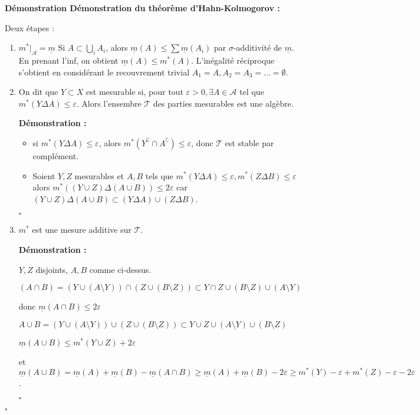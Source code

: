 \documentclass[10pt,a4paper,notitlepage ]{report}
\newcommand{\1}{\mathds 1}
\newcommand{\comp}[1]{#1^\complement}
\newcounter{th}
\newenvironment{demo}[1][]{

	\textbf{Démonstration #1 :}
}{\begin{flushright}
	$\square$
\end{flushright}
}
\begin{document}
\begin{demo}[Démonstration du théorème d'Hahn-Kolmogorov]
	Deux étapes : \begin{enumerate}
		\item $m^*|_{\mathcal A} = \underline m$
		Si $A \subset \underset i \bigcup A_i$, alors $\underline m (A) \le \sum \underline m (A_i)$ par $\sigma$-additivité de $\underline m$. En prenant l'inf, on obtient $\underline m(A) \le m^*(A)$. L'inégalité réciproque s'obtient en considérant le recouvrement trivial $A_1 = A, A_2=A_3 = \dots = \emptyset$.
		\item On dit que $Y \subset X$ est mesurable si, pour tout $\varepsilon > 0, \exists A \in \mathcal A$ tel que $m^*(Y \Delta A) \le \varepsilon$. Alors l'ensembre $\mathcal T$ des parties mesurables est une algèbre.
		\begin{demo}
			\begin{itemize}
				\item si $m^*(Y \Delta A) \le \varepsilon$, alors $m^*(\comp Y \cap \comp A) \le \varepsilon$, donc $\mathcal T$ est stable par complément.
				\item Soient $Y, Z$ mesurables et $A, B$ tels que $m^*(Y \Delta A) \le \varepsilon, m^*(Z \Delta B) \le \varepsilon$ alors $m^*((Y \cup Z) \Delta (A \cup B)) \le 2\varepsilon$ car $(Y \cup Z)  \Delta (A \cup B) \subset (Y \Delta A) \cup (Z \Delta B)$.
			\end{itemize}
		\end{demo}
		\item $m^*$ est une mesure additive sur $\mathcal T$.
		\begin{demo}
			$Y, Z$ disjoints, $A,B$ comme ci-dessus. 
			
			$(A\cap B) = (Y \cup (A \setminus Y)) \cap (Z \cup (B \setminus Z)) \subset Y \cap Z \cup (B \setminus Z) \cup (A \setminus Y)$ 
			
			donc $\underline m (A \cap B) \le 2\varepsilon$
			
			$A \cup B = (Y \cup (A \setminus Y)) \cup (Z \cup (B \setminus Z)) \subset Y \cup Z \cup (A \setminus Y) \cup (B \setminus Z)$
			
			$\underline m (A \cup B) \le m^*(Y \cup Z) +2\varepsilon$
			
			et $\underline m (A \cup B) = \underline m(A) + \underline m(B) - \underline m(A \cap B) \ge \underline m(A) + \underline m(B) -2\varepsilon \ge m^*(Y) - \varepsilon + m^*(Z) - \varepsilon - 2\varepsilon$.
			

\end{demo}
\end{enumerate}
\end{demo}
\end{document}
